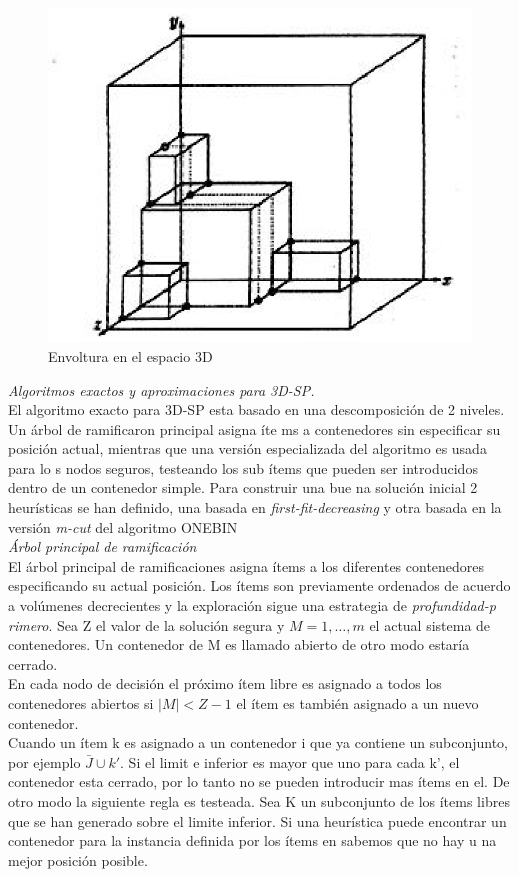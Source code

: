 \begin{figure}[!htb]
\centering
\includegraphics[scale=0.6]{fotos/foto6.eps}
\caption{Envoltura en el espacio 3D}
\end{figure}

\emph{Algoritmos exactos y aproximaciones para 3D-SP.}\\

El algoritmo exacto para 3D-SP esta basado en una descomposición de 2 niveles. Un árbol de ramificaron principal asigna íte
ms a contenedores sin especificar su posición actual, mientras que una versión especializada del algoritmo es usada para lo
s nodos seguros, testeando los sub ítems que pueden ser introducidos dentro de un contenedor simple. Para construir una bue
na solución inicial 2 heurísticas se han definido, una basada en \emph{first-fit-decreasing} y otra basada en la versión \emph{m-cut} del algoritmo ONEBIN\\

\emph{Árbol principal de ramificación}\\

El árbol principal de ramificaciones asigna ítems a los diferentes contenedores especificando su actual posición. Los ítems
 son previamente ordenados de acuerdo a volúmenes decrecientes y la exploración sigue una estrategia de \emph{profundidad-p
rimero}. Sea Z el valor de la solución segura y \(M = {1,\dots{},m}\) el actual sistema de contenedores. Un contenedor de M
 es llamado abierto de otro modo estaría cerrado.\\
En cada nodo de decisión el próximo ítem libre es asignado a todos los contenedores abiertos si \(|M| < Z - 1\) el ítem es
también asignado a un nuevo contenedor.\\
Cuando un ítem k es asignado a un contenedor i que ya contiene un subconjunto, por ejemplo \(\bar{J} \cup k'\). Si el limit
e inferior es mayor que uno para cada k', el contenedor esta cerrado, por lo tanto no se pueden introducir mas ítems en el.
 De otro modo la siguiente regla es testeada. Sea K un subconjunto de los ítems libres que se han generado sobre el limite
inferior. Si una heurística puede encontrar un contenedor para la instancia definida por los ítems en  sabemos que no hay u
na mejor posición posible.\\

